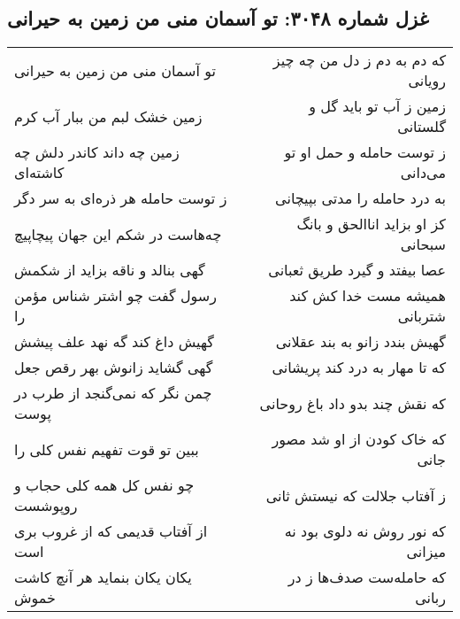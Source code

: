 \begin{center}
\section*{غزل شماره ۳۰۴۸: تو آسمان منی من زمین به حیرانی}
\label{sec:3048}
\begin{longtable}{l p{0.5cm} r}
تو آسمان منی من زمین به حیرانی
&&
که دم به دم ز دل من چه چیز رویانی
\\
زمین خشک لبم من ببار آب کرم
&&
زمین ز آب تو باید گل و گلستانی
\\
زمین چه داند کاندر دلش چه کاشته‌ای
&&
ز توست حامله و حمل او تو می‌دانی
\\
ز توست حامله هر ذره‌ای به سر دگر
&&
به درد حامله را مدتی بپیچانی
\\
چه‌هاست در شکم این جهان پیچاپیچ
&&
کز او بزاید اناالحق و بانگ سبحانی
\\
گهی بنالد و ناقه بزاید از شکمش
&&
عصا بیفتد و گیرد طریق ثعبانی
\\
رسول گفت چو اشتر شناس مؤمن را
&&
همیشه مست خدا کش کند شتربانی
\\
گهیش داغ کند گه نهد علف پیشش
&&
گهیش بندد زانو به بند عقلانی
\\
گهی گشاید زانوش بهر رقص جعل
&&
که تا مهار به درد کند پریشانی
\\
چمن نگر که نمی‌گنجد از طرب در پوست
&&
که نقش چند بدو داد باغ روحانی
\\
ببین تو قوت تفهیم نفس کلی را
&&
که خاک کودن از او شد مصور جانی
\\
چو نفس کل همه کلی حجاب و روپوشست
&&
ز آفتاب جلالت که نیستش ثانی
\\
از آفتاب قدیمی که از غروب بری است
&&
که نور روش نه دلوی بود نه میزانی
\\
یکان یکان بنماید هر آنچ کاشت خموش
&&
که حامله‌ست صدف‌ها ز در ربانی
\\
\end{longtable}
\end{center}
